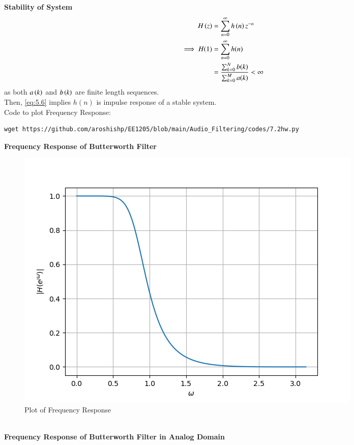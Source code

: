 \documentclass[journal,12pt,twocolumn]{IEEEtran}
\theoremstyle{remark}
\renewcommand\thesection{\arabic{section}}
\numberwithin{equation}{subsection}
\begin{document}
\begin{enumerate}[label=\thesection.\arabic*]
\textbf{Stability of System}
\begin{align}
H\left(z\right) &= \sum_{n = 0}^{\infty} h\left(n\right)z^{-n}\\
\implies H(1)&= \sum_{n = 0}^{\infty}h(n) \\
&= \frac{\sum_{k = 0}^{N}b(k)}{\sum_{k = 0}^{M}a(k)}< \infty
\end{align}
as both $a\left(k\right)$ and $b\left(k\right)$ are finite length sequences.\\
Then, \eqref{eq:5.6} implies $h(n)$ is impulse response of a stable system.
\\
Code to plot Frequency Response:
\begin{lstlisting}
wget https://github.com/aroshishp/EE1205/blob/main/Audio_Filtering/codes/7.2hw.py
\end{lstlisting}

\textbf{Frequency Response of Butterworth Filter}
\begin{figure}[!h]
    \centering
    \includegraphics[width = \columnwidth]{figs/7.2hw.png}
    \caption{Plot of Frequency Response}
    \label{fig:7.2hw}
\end{figure}
\\
\textbf{Frequency Response of Butterworth Filter in Analog Domain}


\end{enumerate}
\end{document}
